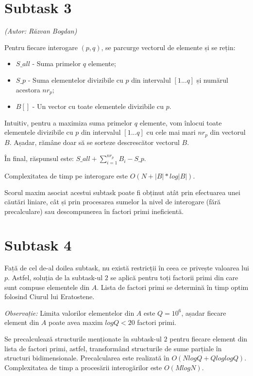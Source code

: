 \documentclass[ro]{problem}
\begin{document}
\section{Subtask 3}
\noindent \emph{(Autor: Răzvan Bogdan)}

\noindent Pentru fiecare interogare $(p, q)$, se parcurge vectorul de elemente și se rețin:

\begin{itemize}
    \item $S\_all$ - Suma primelor $q$ elemente;
    \item $S\_p$ - Suma elementelor divizibile cu $p$ din intervalul $[1...q]$ și numărul acestora $nr_p$;
    \item $B[]$ - Un vector cu toate elementele divizibile cu $p$.
\end{itemize}
\noindent Intuitiv, pentru a maximiza suma primelor $q$ elemente, vom înlocui toate elementele divizibile cu $p$ din intervalul $[1...q]$ cu cele mai mari $nr_p$ din vectorul $B$. Așadar, rămâne doar să se sorteze descrescător vectorul $B$.

\noindent În final, răspunsul este: $S\_all + \sum_{i=1}^{nr_p} B_i - S\_p$.

\noindent Complexitatea de timp pe interogare este $O(N + |B| * log|B|)$.

\noindent Scorul maxim asociat acestui subtask poate fi obținut atât prin efectuarea unei căutări liniare, cât și prin procesarea sumelor la nivel de interogare (fără precalculare) sau descompunerea în factori primi ineficientă.


\section{Subtask 4}
\noindent Față de cel de-al doilea subtask, nu există restricții în ceea ce privește valoarea lui $p$. Astfel, soluția de la subtask-ul $2$ se aplică pentru toți factorii primi din care sunt compuse elementele din $A$. Lista de factori primi se determină în timp optim folosind Ciurul lui Eratostene.

\emph{Observație:} Limita valorilor elementelor din $A$ este $Q = 10^6$, așadar fiecare element din $A$ poate avea maxim $logQ < 20$ factori primi.

\noindent Se precalculează structurile menționate în subtask-ul $2$ pentru fiecare element din lista de factori primi, astfel, transformând structurile de sume parțiale în structuri bidimensionale. Precalcularea este realizată în $O(NlogQ + QloglogQ)$. Complexitatea de timp a procesării interogărilor este $O(MlogN)$. 
\end{document}
